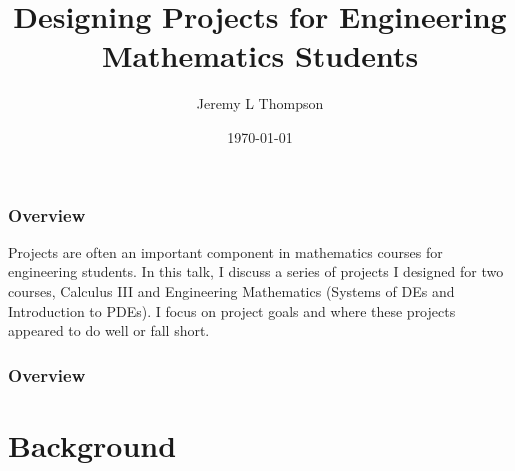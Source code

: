 \documentclass{beamer}
\title[Projects for Engr Math Students]{Designing Projects for Engineering Mathematics Students} %
\author{Jeremy L Thompson} %
\institute[USAFA] %
{United States Air Force Academy \\ %
\medskip
\textit{jeremy.thompson@usafa.edu} %
}
\date{\today} %
\begin{document}
\begin{frame}
\titlepage %
\end{frame}


\begin{frame}
\begin{center}
\frametitle{Overview}

Projects are often an important component in mathematics courses for engineering students. In this talk, I discuss a series of projects I designed for two courses, Calculus III and Engineering Mathematics (Systems of DEs and Introduction to PDEs). I focus on project goals and where these projects appeared to do well or fall short.

\end{center}
\end{frame}
 

\begin{frame}
\frametitle{Overview} %
\tableofcontents %
\end{frame}


\section{Background}
\end{document}
